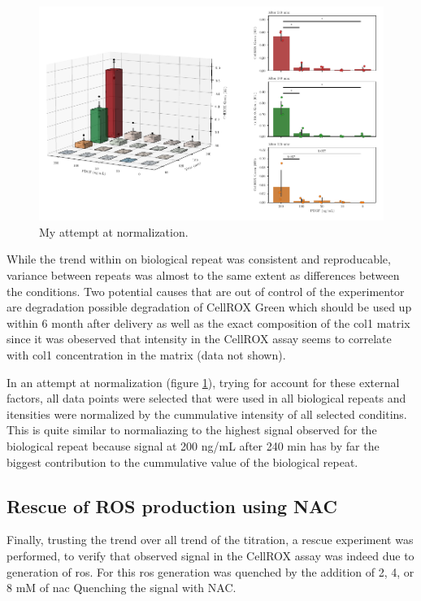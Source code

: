     \begin{figure}[h]
    \capstart
        \centering
    	\includegraphics{Abbildung/CellROX_titration_norm.pdf}
    	\begin{minipage}{\captionwidth}
    		\caption[cellROX_titration_norm]{ \newline My attempt at normalization.}
    		\label{fig:cellROX_titration_norm}
    	\end{minipage}
    \end{figure}

    While the trend within on biological repeat was consistent and reproducable, variance between repeats was almost to the same extent as differences between the conditions. Two potential causes that are out of control of the experimentor are degradation possible degradation of CellROX Green which should be used up within 6 month after delivery as well as the exact composition of the \ac{col1} matrix since it was obeserved that intensity in the CellROX assay seems to correlate with \ac{col1} concentration in the matrix (data not shown).

    In an attempt at normalization (figure \ref{fig:cellROX_titration_norm}), trying for account for these external factors, all data points were selected that were used in all biological repeats and itensities were normalized by the cummulative intensity of all selected conditins. This is quite similar to normaliazing to the highest signal observed for the biological repeat because signal at 200 ng/mL after 240 min has by far the biggest contribution to the cummulative value of the biological repeat.

    \subsection{Rescue of ROS production using NAC}
    Finally, trusting the trend over all trend of the titration, a rescue experiment was performed, to verify that observed signal in the CellROX assay was indeed due to generation of \ac{ros}. For this \ac{ros} generation was quenched by the addition of 2, 4, or 8 mM of \ac{nac} Quenching the signal with NAC.

